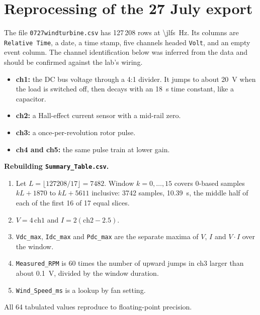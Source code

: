 \documentclass[11pt]{article}
\begin{document}
\section{Reprocessing of the 27 July export}\label{app:jeong}
The file \texttt{0727windturbine.csv} has 127\,208 rows at \SI{\jlfs}{Hz}. Its columns are
\texttt{Relative Time}, a date, a time stamp, five channels headed \texttt{Volt}, and an empty
event column. The channel identification below was inferred from the data and should be
confirmed against the lab's wiring.
\begin{itemize}
  \item \textbf{ch1:} the DC bus voltage through a 4:1 divider. It jumps to about \SI{20}{V}
        when the load is switched off, then decays with an \SI{18}{s} time constant, like a
        capacitor.
  \item \textbf{ch2:} a Hall-effect current sensor with a mid-rail zero.
  \item \textbf{ch3:} a once-per-revolution rotor pulse.
  \item \textbf{ch4 and ch5:} the same pulse train at lower gain.
\end{itemize}

\textbf{Rebuilding \texttt{Summary\_Table.csv}.}
\begin{enumerate}
  \item Let $L=\lfloor 127208/17 \rfloor = 7482$. Window $k=0,\dots,15$ covers 0-based samples
        $kL+1870$ to $kL+5611$ inclusive: 3742 samples, \SI{10.39}{s}, the middle half of
        each of the first 16 of 17 equal slices.
  \item $V = 4\,\mathrm{ch1}$ and $I = 2(\mathrm{ch2}-2.5)$.
  \item \texttt{Vdc\_max}, \texttt{Idc\_max} and \texttt{Pdc\_max} are the separate maxima of
        $V$, $I$ and $V\!\cdot\!I$ over the window.
  \item \texttt{Measured\_RPM} is 60 times the number of upward jumps in ch3 larger than about
        \SI{0.1}{V}, divided by the window duration.
  \item \texttt{Wind\_Speed\_ms} is a lookup by fan setting.
\end{enumerate}
All 64 tabulated values reproduce to floating-point precision.
\end{document}

